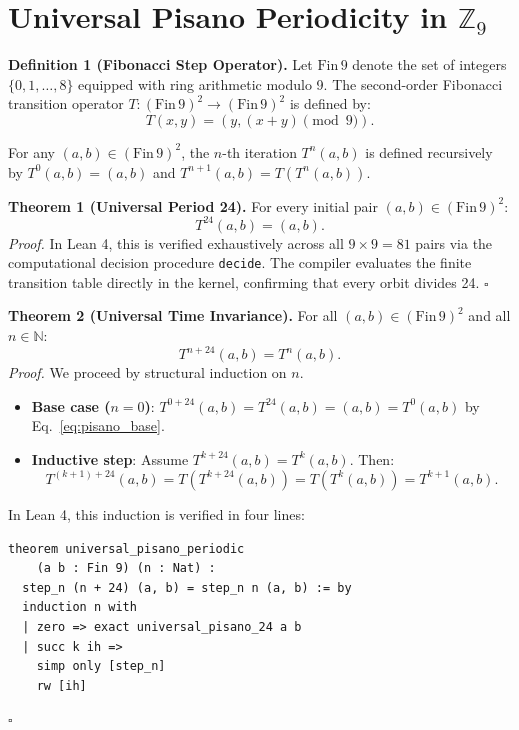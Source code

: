 \documentclass[10pt,twocolumn,a4paper]{article}
\newenvironment{proof}{\noindent\textit{Proof.}}{\hfill$\square$\vspace{0.2cm}}
\begin{document}
\section{Universal Pisano Periodicity in \texorpdfstring{$\mathbb{Z}_9$}{Z9}}

\noindent\textbf{Definition 1 (Fibonacci Step Operator).}
Let $\mathrm{Fin}\,9$ denote the set of integers $\{0, 1, \dots, 8\}$ equipped with ring arithmetic modulo 9. The second-order Fibonacci transition operator $T : (\mathrm{Fin}\,9)^2 \to (\mathrm{Fin}\,9)^2$ is defined by:
\begin{equation}
T(x, y) = (y, (x + y) \pmod 9).
\end{equation}

For any $(a, b) \in (\mathrm{Fin}\,9)^2$, the $n$-th iteration $T^n(a, b)$ is defined recursively by $T^0(a, b) = (a, b)$ and $T^{n+1}(a, b) = T(T^n(a, b))$.

\vspace{0.2cm}
\noindent\textbf{Theorem 1 (Universal Period 24).}
For every initial pair $(a, b) \in (\mathrm{Fin}\,9)^2$:
\begin{equation}
T^{24}(a, b) = (a, b).
\label{eq:pisano_base}
\end{equation}
\begin{proof}
In Lean 4, this is verified exhaustively across all $9 \times 9 = 81$ pairs via the computational decision procedure \texttt{decide}. The compiler evaluates the finite transition table directly in the kernel, confirming that every orbit divides 24.
\end{proof}

\noindent\textbf{Theorem 2 (Universal Time Invariance).}
For all $(a, b) \in (\mathrm{Fin}\,9)^2$ and all $n \in \mathbb{N}$:
\begin{equation}
T^{n + 24}(a, b) = T^n(a, b).
\label{eq:pisano_inductive}
\end{equation}
\begin{proof}
We proceed by structural induction on $n$.
\begin{itemize}
\item \textbf{Base case ($n = 0$)}: $T^{0 + 24}(a, b) = T^{24}(a, b) = (a, b) = T^0(a, b)$ by Eq.~\eqref{eq:pisano_base}.
\item \textbf{Inductive step}: Assume $T^{k + 24}(a, b) = T^k(a, b)$. Then:
\begin{equation}
T^{(k+1) + 24}(a, b) = T(T^{k+24}(a, b)) = T(T^k(a, b)) = T^{k+1}(a, b).
\end{equation}
\end{itemize}
In Lean 4, this induction is verified in four lines:
\begin{verbatim}
theorem universal_pisano_periodic 
    (a b : Fin 9) (n : Nat) :
  step_n (n + 24) (a, b) = step_n n (a, b) := by
  induction n with
  | zero => exact universal_pisano_24 a b
  | succ k ih =>
    simp only [step_n]
    rw [ih]
\end{verbatim}
\end{proof}
\end{document}
